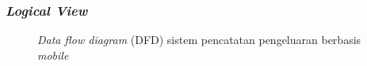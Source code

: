 \subsubsection{\emph{Logical View}}
\label{subsubsec:logical-view}
\begin{figure}[htbp]
    \centering
    \caption{\emph{Data flow diagram} (DFD) sistem pencatatan pengeluaran berbasis \emph{mobile}}
    \label{fig:data-flow-diagram}
\end{figure}